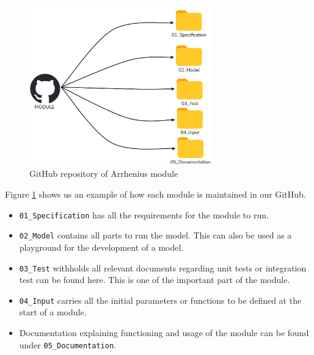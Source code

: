 \begin{figure}[!h]
    \centering
    \includegraphics[width=0.7\textwidth]{Images/Module_structure_in_github.png}
    \caption{GitHub repository of Arrhenius module}
    \label{github_arrhenius}
\end{figure}

Figure \ref{github_arrhenius} shows us an example of how each module is maintained in our GitHub.
\begin{itemize}
    \item \verb|01_Specification| has all the requirements for the module to run.
    \item \verb|02_Model| contains all parts to run the model. This can also be used as a playground for the development of a model.
    \item \verb|03_Test| withholds all relevant documents regarding unit tests or integration test can be found here. This is one of the important part 
                        of the module.
    \item \verb|04_Input| carries all the initial parameters or functions to be defined at the start of a module.
    \item Documentation explaining functioning and usage of the module can be found under \verb|05_Documentation|.
\end{itemize}
